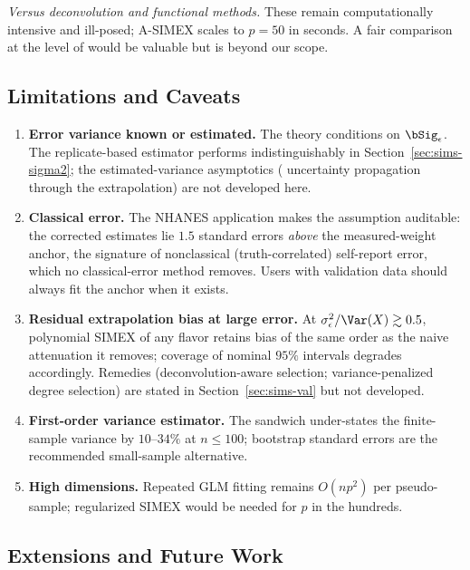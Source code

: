 \emph{Versus deconvolution and functional methods.} These remain
computationally intensive and ill-posed; A-SIMEX scales to $p=50$
in seconds. A fair comparison at the level of
\citet{delaigle2008} would be valuable but is beyond our scope.

\subsection{Limitations and Caveats}

\begin{enumerate}\itemsep3pt
\item \textbf{Error variance known or estimated.} The theory
      conditions on $\bSig_\epsilon$. The replicate-based estimator
      performs indistinguishably in Section~\ref{sec:sims-sigma2};
      the estimated-variance asymptotics ( uncertainty propagation
      through the extrapolation) are not developed here.
\item \textbf{Classical error.} The NHANES application makes the
      assumption auditable: the corrected estimates lie
      $1.5$ standard errors \emph{above} the measured-weight anchor,
      the signature of nonclassical (truth-correlated) self-report
      error, which no classical-error method removes. Users with
      validation data should always fit the anchor when it exists.
\item \textbf{Residual extrapolation bias at large error.} At
      $\sigma^2_\epsilon/\Var(X)\gtrsim0.5$, polynomial SIMEX of any
      flavor retains bias of the same order as the naive attenuation
      it removes; coverage of nominal $95\%$ intervals degrades
      accordingly. Remedies (deconvolution-aware selection;
      variance-penalized degree selection) are stated in
      Section~\ref{sec:sims-val} but not developed.
\item \textbf{First-order variance estimator.} The sandwich
      under-states the finite-sample variance by $10$--$34\%$ at
      $n\le100$; bootstrap standard errors are the recommended
      small-sample alternative.
\item \textbf{High dimensions.} Repeated GLM fitting remains
      $O(np^2)$ per pseudo-sample; regularized SIMEX would be needed
      for $p$ in the hundreds.
\end{enumerate}

\subsection{Extensions and Future Work}

